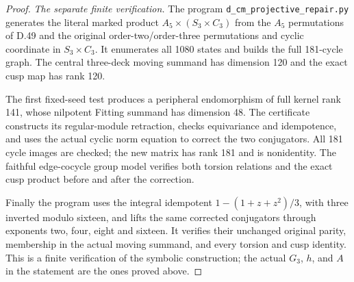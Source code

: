 \begin{proof}
\emph{The separate finite verification.}
The program \texttt{d\_cm\_projective\_repair.py}
generates the literal marked product
\(A_5\times(S_3\times C_3)\) from the
\(A_5\) permutations of D.49 and the original
order-two/order-three permutations and cyclic
coordinate in \(S_3\times C_3\).
It enumerates all 1080 states and builds
the full 181-cycle graph. The central
three-deck moving summand has dimension
120 and the exact cusp map has rank 120.

The first fixed-seed test produces a peripheral
endomorphism of full kernel rank 141, whose
nilpotent Fitting summand has dimension 48.
The certificate constructs its regular-module
retraction, checks equivariance and idempotence,
and uses the actual cyclic norm equation to
correct the two conjugators. All 181 cycle
images are checked; the new matrix has rank
181 and is nonidentity. The faithful
edge-cocycle group model verifies both
torsion relations and the exact cusp product
before and after the correction.

Finally the program uses the integral
idempotent \(1-(1+z+z^2)/3\), with three
inverted modulo sixteen, and lifts the
same corrected conjugators through exponents
two, four, eight and sixteen. It verifies
their unchanged original parity, membership
in the actual moving summand, and every
torsion and cusp identity. This is a finite
verification of the symbolic construction;
the actual \(G_3\), \(h\), and \(A\) in the
statement are the ones proved above.
\end{proof}
